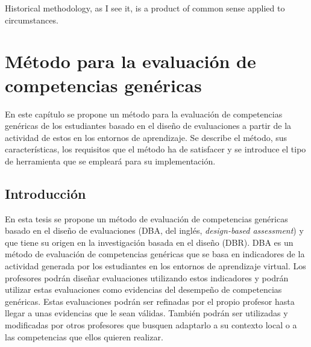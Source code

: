 

\begin{savequote}[50mm]
Historical methodology, as I see it, is a product of common sense applied to circumstances. 
\end{savequote}


\chapter{Método para la evaluación de competencias genéricas}
\label{cha:Overall methodology}

\ifpdf
    \graphicspath{{4_overall_methodology/figures/PNG/}{4_overall_methodology/figures/PDF/}{4_overall_methodology/figures/}}
\else
    \graphicspath{{4_overall_methodology/figures/EPS/}{4_overall_methodology/figures/}}
\fi


En este capítulo se propone un método para la evaluación de competencias genéricas de los estudiantes basado en el diseño de evaluaciones a partir de la actividad de estos en los entornos de aprendizaje. Se describe el método, sus características, los requisitos que el método ha de satisfacer y se introduce el tipo de herramienta que se empleará para su implementación.

\section{Introducción}

En esta tesis se propone un método de evaluación de competencias genéricas basado en el diseño de evaluaciones (DBA, del inglés, \emph{design-based assessment}) y que tiene su origen en la investigación basada en el diseño (DBR). DBA es un método de evaluación de competencias genéricas que se basa en indicadores de la actividad generada por los estudiantes en los entornos de aprendizaje virtual. Los profesores podrán diseñar evaluaciones utilizando estos indicadores y podrán utilizar estas evaluaciones como evidencias del desempeño de competencias genéricas. Estas evaluaciones podrán ser refinadas por el propio profesor hasta llegar a unas evidencias que le sean válidas. También podrán ser utilizadas y modificadas por otros profesores que busquen adaptarlo a su contexto local o a las competencias que ellos quieren realizar. 

